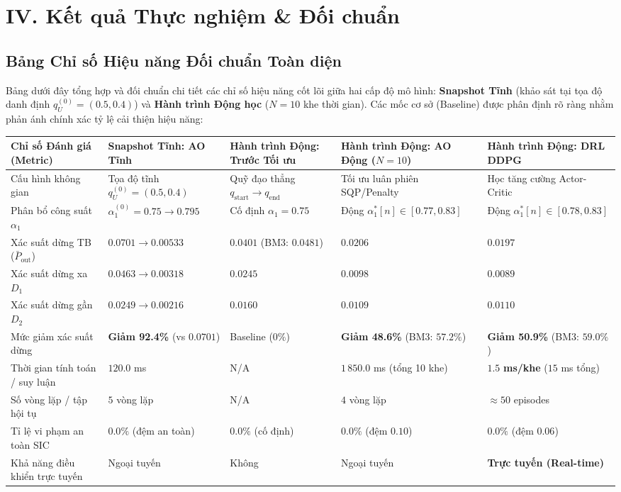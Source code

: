 \section*{IV. Kết quả Thực nghiệm \& Đối chuẩn}

\subsection*{Bảng Chỉ số Hiệu năng Đối chuẩn Toàn diện}
Bảng dưới đây tổng hợp và đối chuẩn chi tiết các chỉ số hiệu năng cốt lõi giữa hai cấp độ mô hình: \textbf{Snapshot Tĩnh} (khảo sát tại tọa độ danh định $q_U^{(0)} = (0.5, 0.4)$) và \textbf{Hành trình Động học} ($N=10$ khe thời gian). Các mốc cơ sở (Baseline) được phân định rõ ràng nhằm phản ánh chính xác tỷ lệ cải thiện hiệu năng:

\vspace{0.2cm}
\begin{center}
\renewcommand{\arraystretch}{1.25}
\begin{tabularx}{\textwidth}{|X|>{\centering\arraybackslash}m{2.3cm}|>{\centering\arraybackslash}m{2.3cm}|>{\centering\arraybackslash}m{2.3cm}|>{\centering\arraybackslash}m{2.5cm}|}
\hline
\rowcolor{tableheader}
\textbf{Chỉ số Đánh giá (Metric)} & \textbf{Snapshot Tĩnh: AO Tĩnh} & \textbf{Hành trình Động: Trước Tối ưu} & \textbf{Hành trình Động: AO Động ($N=10$)} & \textbf{Hành trình Động: DRL DDPG} \\
\hline
Cấu hình không gian & Tọa độ tĩnh $q_U^{(0)}=(0.5, 0.4)$ & Quỹ đạo thẳng $q_{\text{start}} \to q_{\text{end}}$ & Tối ưu luân phiên SQP/Penalty & Học tăng cường Actor-Critic \\
Phân bổ công suất $\alpha_1$ & $\alpha_1^{(0)} = 0.75 \to 0.795$ & Cố định $\alpha_1 = 0.75$ & Động $\alpha_1^*[n] \in [0.77, 0.83]$ & Động $\alpha_1^*[n] \in [0.78, 0.83]$ \\
\hline
Xác suất dừng TB ($\bar{P}_{\text{out}}$) & $0.0701 \to \mathbf{0.00533}$ & $0.0401$ (BM3: $0.0481$) & $\mathbf{0.0206}$ & $\mathbf{0.0197}$ \\
Xác suất dừng xa $D_1$ & $0.0463 \to 0.00318$ & $0.0245$ & $0.0098$ & $0.0089$ \\
Xác suất dừng gần $D_2$ & $0.0249 \to 0.00216$ & $0.0160$ & $0.0109$ & $0.0110$ \\
\hline
Mức giảm xác suất dừng & \textbf{Giảm 92.4\%} (vs $0.0701$) & Baseline ($0\%$) & \textbf{Giảm 48.6\%} (BM3: $57.2\%$) & \textbf{Giảm 50.9\%} (BM3: $59.0\%$) \\
Thời gian tính toán / suy luận & $120.0$ ms & N/A & $1\,850.0$ ms (tổng 10 khe) & $\mathbf{1.5}$ \textbf{ms/khe} ($15$ ms tổng) \\
Số vòng lặp / tập hội tụ & $5$ vòng lặp & N/A & $4$ vòng lặp & $\approx 50$ episodes \\
Tỉ lệ vi phạm an toàn SIC & $\mathbf{0.0\%}$ (đệm an toàn) & $0.0\%$ (cố định) & $\mathbf{0.0\%}$ (đệm $0.10$) & $\mathbf{0.0\%}$ (đệm $0.06$) \\
Khả năng điều khiển trực tuyến & Ngoại tuyến & Không & Ngoại tuyến & \textbf{Trực tuyến (Real-time)} \\
\hline
\end{tabularx}
\end{center}
\vspace{0.2cm}

